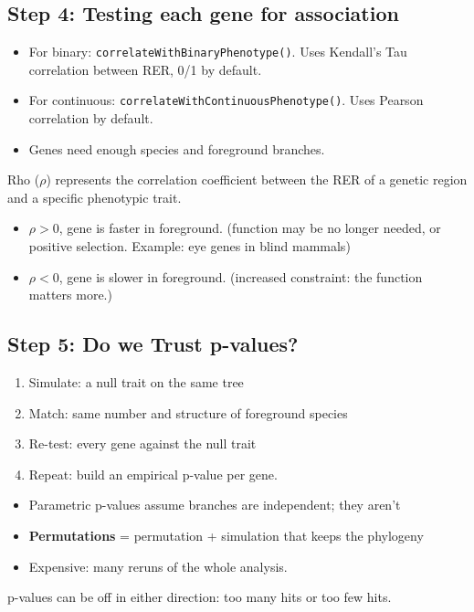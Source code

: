 \documentclass[10pt]{article}
\begin{document}
\subsection*{Step 4: Testing each gene for association}
\begin{itemize}
    \item For binary: \texttt{correlateWithBinaryPhenotype()}.  Uses Kendall's Tau correlation between RER, 0/1 by default.
    \item For continuous: \texttt{correlateWithContinuousPhenotype()}.  Uses Pearson correlation by default.
    \item Genes need enough species and foreground branches.
\end{itemize}
Rho ($\rho$) represents the correlation coefficient between the RER of a genetic region and a specific phenotypic trait.
\begin{itemize}
    \item $\rho > 0$, gene is faster in foreground.  (function may be no longer needed, or positive selection.  Example: eye genes in blind mammals)
    \item $\rho < 0$, gene is slower in foreground.  (increased constraint: the function matters more.)
\end{itemize}

\subsection*{Step 5: Do we Trust p-values?}
\begin{enumerate}
    \item Simulate: a null trait on the same tree
    \item Match: same number and structure of foreground species
    \item Re-test: every gene against the null trait
    \item Repeat: build an empirical p-value per gene.
\end{enumerate}
\begin{itemize}
    \item Parametric p-values assume branches are independent; they aren't
    \item \textbf{Permutations} = permutation + simulation that keeps the phylogeny
    \item Expensive: many reruns of the whole analysis.
\end{itemize}
p-values can be off in either direction: too many hits or too few hits.
\end{document}
